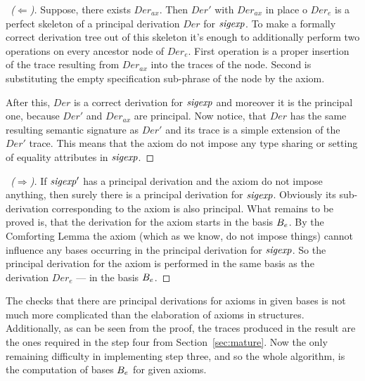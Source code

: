 \begin{proof}[\proofname\ ($\Leftarrow$)]
Suppose, there exists $Der_{ax}$. Then $Der'$ with $Der_{ax}$ in place o $Der_e$
is a perfect skeleton of a principal derivation $Der$ for ${\it sigexp}$. To make a formally correct
derivation tree out of this skeleton it's enough to additionally perform two operations 
on every ancestor node of $Der_e$. First operation is a proper insertion of
the trace resulting from $Der_{ax}$ into the traces of the node. 
Second is substituting the empty specification sub-phrase of the node by the axiom. 

After this, $Der$ is a correct derivation for ${\it sigexp}$ and moreover it is the principal one, 
because $Der'$ and $Der_{ax}$ are principal. Now notice, that $Der$ has 
the same resulting semantic signature as $Der'$ and its trace is 
a simple extension of the $Der'$ trace. This means that the axiom 
do not impose any type sharing or setting of equality attributes in ${\it sigexp}$. 
\end{proof}

\begin{proof}[\proofname\ ($\Rightarrow$)]
If ${\it sigexp}'$ has a principal derivation and the axiom do not impose anything,
then surely there is a principal derivation for ${\it sigexp}$. Obviously its sub-derivation corresponding
to the axiom is also principal. What remains to be proved is, that the derivation for the axiom
starts in the basis $B_e$. By the Comforting Lemma the axiom (which as we know, do not impose things)
cannot influence any bases occurring in the principal derivation for ${\it sigexp}$.
So the principal derivation for the axiom is performed in the same basis as the derivation $Der_e$ --- 
in the basis $B_e$. 
\end{proof}

The checks that there are principal derivations for axioms in given bases is not much more
complicated than the elaboration of axioms in structures. Additionally, as can be seen from
the proof, the traces produced in the result are the ones required in the step four 
from Section~\ref{sec:mature}. Now the only remaining difficulty in implementing step three, 
and so the whole algorithm, is the computation of bases $B_e$ for given axioms.

\section{\secinter}
\label{sec:inter}

